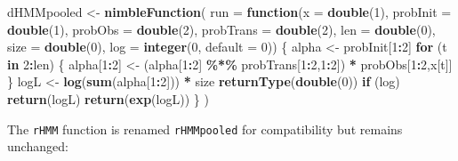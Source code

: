 \documentclass[
  12pt,
]{krantz}
\newenvironment{Shaded}{\begin{snugshade}}{\end{snugshade}}
\newcommand{\AttributeTok}[1]{\textcolor[rgb]{0.13,0.29,0.53}{#1}}
\newcommand{\ControlFlowTok}[1]{\textcolor[rgb]{0.13,0.29,0.53}{\textbf{#1}}}
\newcommand{\DecValTok}[1]{\textcolor[rgb]{0.00,0.00,0.81}{#1}}
\newcommand{\FunctionTok}[1]{\textcolor[rgb]{0.13,0.29,0.53}{\textbf{#1}}}
\newcommand{\NormalTok}[1]{#1}
\newcommand{\OtherTok}[1]{\textcolor[rgb]{0.56,0.35,0.01}{#1}}
\newcommand{\SpecialCharTok}[1]{\textcolor[rgb]{0.81,0.36,0.00}{\textbf{#1}}}
\begin{document}
\begin{Shaded}
\begin{Highlighting}[]
\NormalTok{dHMMpooled }\OtherTok{\textless{}{-}} \FunctionTok{nimbleFunction}\NormalTok{(}
  \AttributeTok{run =} \ControlFlowTok{function}\NormalTok{(}\AttributeTok{x =} \FunctionTok{double}\NormalTok{(}\DecValTok{1}\NormalTok{), }
                 \AttributeTok{probInit =} \FunctionTok{double}\NormalTok{(}\DecValTok{1}\NormalTok{),}
                 \AttributeTok{probObs =} \FunctionTok{double}\NormalTok{(}\DecValTok{2}\NormalTok{),}
                 \AttributeTok{probTrans =} \FunctionTok{double}\NormalTok{(}\DecValTok{2}\NormalTok{),}
                 \AttributeTok{len =} \FunctionTok{double}\NormalTok{(}\DecValTok{0}\NormalTok{),}
                 \AttributeTok{size =} \FunctionTok{double}\NormalTok{(}\DecValTok{0}\NormalTok{),}
                 \AttributeTok{log =} \FunctionTok{integer}\NormalTok{(}\DecValTok{0}\NormalTok{, }\AttributeTok{default =} \DecValTok{0}\NormalTok{)) \{}
\NormalTok{    alpha }\OtherTok{\textless{}{-}}\NormalTok{ probInit[}\DecValTok{1}\SpecialCharTok{:}\DecValTok{2}\NormalTok{]}
    \ControlFlowTok{for}\NormalTok{ (t }\ControlFlowTok{in} \DecValTok{2}\SpecialCharTok{:}\NormalTok{len) \{}
\NormalTok{      alpha[}\DecValTok{1}\SpecialCharTok{:}\DecValTok{2}\NormalTok{] }\OtherTok{\textless{}{-}}\NormalTok{ (alpha[}\DecValTok{1}\SpecialCharTok{:}\DecValTok{2}\NormalTok{] }\SpecialCharTok{\%*\%}\NormalTok{ probTrans[}\DecValTok{1}\SpecialCharTok{:}\DecValTok{2}\NormalTok{,}\DecValTok{1}\SpecialCharTok{:}\DecValTok{2}\NormalTok{]) }\SpecialCharTok{*}\NormalTok{ probObs[}\DecValTok{1}\SpecialCharTok{:}\DecValTok{2}\NormalTok{,x[t]]}
\NormalTok{    \}}
\NormalTok{    logL }\OtherTok{\textless{}{-}} \FunctionTok{log}\NormalTok{(}\FunctionTok{sum}\NormalTok{(alpha[}\DecValTok{1}\SpecialCharTok{:}\DecValTok{2}\NormalTok{])) }\SpecialCharTok{*}\NormalTok{ size}
    \FunctionTok{returnType}\NormalTok{(}\FunctionTok{double}\NormalTok{(}\DecValTok{0}\NormalTok{))}
    \ControlFlowTok{if}\NormalTok{ (log) }\FunctionTok{return}\NormalTok{(logL)}
    \FunctionTok{return}\NormalTok{(}\FunctionTok{exp}\NormalTok{(logL))}
\NormalTok{  \}}
\NormalTok{)}
\end{Highlighting}
\end{Shaded}

The \texttt{rHMM} function is renamed \texttt{rHMMpooled} for compatibility but remains unchanged:
\end{document}
